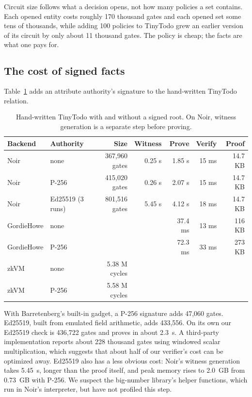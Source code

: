 \documentclass[11pt]{article}
\begin{document}
Circuit size follows what a decision opens, not how many policies a set contains. Each opened entity costs roughly 170 thousand gates and each opened set some tens of thousands, while adding 100 policies to TinyTodo grew an earlier version of its circuit by only about 11 thousand gates. The policy is cheap; the facts are what one pays for.

\subsection{The cost of signed facts}
\label{sec:sigcost}

Table~\ref{tab:signed} adds an attribute authority's signature to the hand-written TinyTodo relation.

\begin{table}[t]
\centering
\caption{Hand-written TinyTodo with and without a signed root. On Noir, witness generation is a separate step before proving.}
\label{tab:signed}
\begin{tabular}{@{}llrrrrr@{}}
\toprule
Backend & Authority & Size & Witness & Prove & Verify & Proof \\
\midrule
Noir & none & 367,960 gates & 0.25 s & 1.85 s & 15 ms & 14.7 KB \\
Noir & P-256 & 415,020 gates & 0.26 s & 2.07 s & 15 ms & 14.7 KB \\
Noir & Ed25519 (3 runs) & 801,516 gates & 5.45 s & 4.12 s & 18 ms & 14.7 KB \\
GordieHowe & none & & & 37.4 ms & 13 ms & 116 KB \\
GordieHowe & P-256 & & & 72.3 ms & 33 ms & 273 KB \\
zkVM & none & 5.38 M cycles & & & & \\
zkVM & P-256 & 5.58 M cycles & & & & \\
\bottomrule
\end{tabular}
\end{table}

With Barretenberg's built-in gadget, a P-256 signature adds 47,060 gates. Ed25519, built from emulated field arithmetic, adds 433,556. On its own our Ed25519 check is 436,722 gates and proves in about 2.3~s. A third-party implementation reports about 228 thousand gates using windowed scalar multiplication, which suggests that about half of our verifier's cost can be optimized away. Ed25519 also has a less obvious cost: Noir's witness generation takes 5.45~s, longer than the proof itself, and peak memory rises to 2.0~GB from 0.73~GB with P-256. We suspect the big-number library's helper functions, which run in Noir's interpreter, but have not profiled this step.
\end{document}
